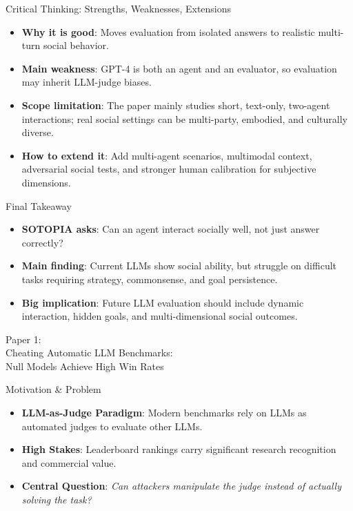 \documentclass[10pt]{beamer}
\begin{document}
\begin{frame}{Critical Thinking: Strengths, Weaknesses, Extensions}
	\begin{itemize}
		\item \textbf{Why it is good}: Moves evaluation from isolated answers to realistic multi-turn social behavior.
		\item \textbf{Main weakness}: GPT-4 is both an agent and an evaluator, so evaluation may inherit LLM-judge biases.
		\item \textbf{Scope limitation}: The paper mainly studies short, text-only, two-agent interactions; real social settings can be multi-party, embodied, and culturally diverse.
		\item \textbf{How to extend it}: Add multi-agent scenarios, multimodal context, adversarial social tests, and stronger human calibration for subjective dimensions.
	\end{itemize}
\end{frame}

\begin{frame}{Final Takeaway}
	\begin{itemize}
		\item \textbf{SOTOPIA asks}: Can an agent interact socially well, not just answer correctly?
		\item \textbf{Main finding}: Current LLMs show social ability, but struggle on difficult tasks requiring strategy, commonsense, and goal persistence.
		\item \textbf{Big implication}: Future LLM evaluation should include dynamic interaction, hidden goals, and multi-dimensional social outcomes.
	\end{itemize}
\end{frame}






\begin{frame}[standout]
  \hypertarget{paper1}{}
  \Large Paper 1:\\Cheating Automatic LLM Benchmarks:\\Null Models Achieve High Win Rates
\end{frame}

\begin{frame}{Motivation \& Problem}
  \begin{itemize}
    \item \textbf{LLM-as-Judge Paradigm}: Modern benchmarks rely on LLMs as automated judges to evaluate other LLMs.
    \item \textbf{High Stakes}: Leaderboard rankings carry significant research recognition and commercial value.
    \item \textbf{Central Question}: \textit{Can attackers manipulate the judge instead of actually solving the task?}
  \end{itemize}
\end{frame}
\end{document}
